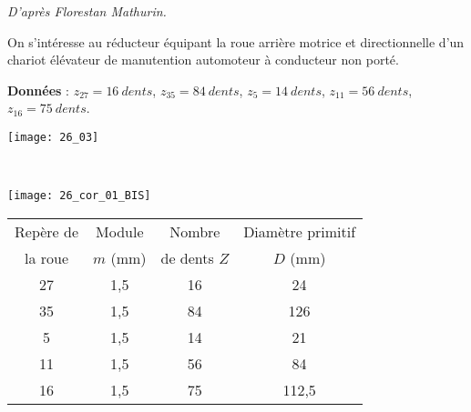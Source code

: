 \normaltrue \difficilefalse \tdifficilefalse
\correctiontrue



\textit{D'après Florestan Mathurin.}

\setcounter{question}{0}%
\ifcorrection
\else
{}
\fi

\ifprof
\else
On s’intéresse au réducteur équipant la roue arrière motrice et directionnelle d’un chariot élévateur de manutention automoteur à conducteur non porté. 


\textbf{Données }: $z_{27} = \SI{16}{dents}$, $z_{35} = \SI{84}{dents}$, $z_{5} = \SI{14}{dents}$, $z_{11} = \SI{56}{dents}$, $z_{16} = \SI{75}{dents}$. 

\fi


\ifprof
\else
\begin{marginfigure}
\texttt{[image: 26\_03]}
\end{marginfigure}
\fi

\ifprof ~\\
\begin{marginfigure}
\texttt{[image: 26\_cor\_01\_BIS]}
\end{marginfigure}
\else
\fi

\ifprof

\begin{center}
\begin{tabular}{cccc}
\hline
Repère de  & Module  & Nombre & Diamètre primitif  \\
la roue & $m$ (mm) & de dents $Z$ & $D$ (mm) \\
\hline
27 & 1,5 &16 & 24\\ 
35 & 1,5 &84 & 126\\ 
5   &1,5 &14 & 21\\ 
11 & 1,5 & 56 & 84 \\ 
16 &  1,5&  75& 112,5\\ \hline

\end{tabular}
\end{center}

